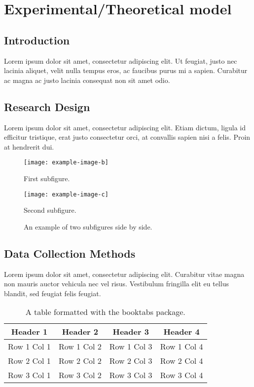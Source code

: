 \chapter{Experimental/Theoretical model}
\section{Introduction}
Lorem ipsum dolor sit amet, consectetur adipiscing elit. Ut feugiat, justo nec lacinia aliquet, velit nulla tempus eros, ac faucibus purus mi a sapien. Curabitur ac magna ac justo lacinia consequat non sit amet odio.

\section{Research Design}
Lorem ipsum dolor sit amet, consectetur adipiscing elit. Etiam dictum, ligula id efficitur tristique, erat justo consectetur orci, at convallis sapien nisi a felis. Proin at hendrerit dui.
\begin{figure}[ht]
        \texttt{[image: example-image-b]}
        \caption{First subfigure.}
        \label{fig:sub1}
\end{figure}
\begin{figure}
        \texttt{[image: example-image-c]}
        \caption{Second subfigure.}
        \label{fig:sub2}
    \caption{An example of two subfigures side by side.}
    \label{fig:sidebyside}
\end{figure}
\section{Data Collection Methods}
Lorem ipsum dolor sit amet, \cite{wikipedia2023artificial}consectetur adipiscing elit. Curabitur vitae magna non mauris auctor vehicula nec vel risus. Vestibulum fringilla elit eu tellus blandit, sed feugiat felis feugiat.
\begin{table}[ht]
    \centering
    \begin{tabular}{cccc}
        \toprule
        Header 1 & Header 2 & Header 3 & Header 4 \\
        \midrule
        Row 1 Col 1 & Row 1 Col 2 & Row 1 Col 3 & Row 1 Col 4 \\
        Row 2 Col 1 & Row 2 Col 2 & Row 2 Col 3 & Row 2 Col 4 \\
        Row 3 Col 1 & Row 3 Col 2 & Row 3 Col 3 & Row 3 Col 4 \\
        \bottomrule
    \end{tabular}
    \caption{A table formatted with the booktabs package.}
    \label{tab:booktabs}
\end{table}
